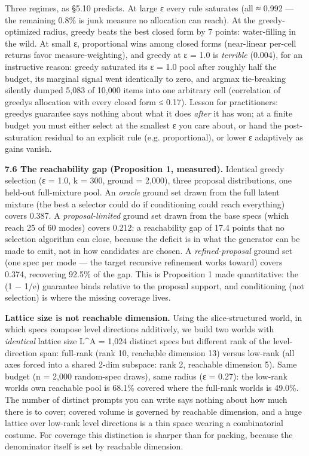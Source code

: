 \documentclass[
  10pt,
]{article}
\theoremstyle{plain}
\theoremstyle{definition}
\begin{document}
Three regimes, as §5.10 predicts. At large ε every rule saturates (all ≈
0.992 --- the remaining 0.8\% is junk measure no allocation can reach).
At the greedy-optimized radius, greedy beats the best closed form by 7
points: water-filling in the wild. At small ε, proportional wins among
closed forms (near-linear per-cell returns favor measure-weighting), and
greedy at ε = 1.0 is \emph{terrible} (0.004), for an instructive reason:
greedy saturated its ε = 1.0 pool after roughly half the budget, its
marginal signal went identically to zero, and argmax tie-breaking
silently dumped 5,083 of 10,000 items into one arbitrary cell
(correlation of greedy\textquotesingle s allocation with every closed
form ≤ 0.17). Lesson for practitioners: greedy\textquotesingle s
guarantee says nothing about what it does \emph{after} it has won; at a
finite budget you must either select at the smallest ε you care about,
or hand the post-saturation residual to an explicit rule (e.g.
proportional), or lower ε adaptively as gains vanish.

\textbf{7.6 The reachability gap (Proposition 1, measured).} Identical
greedy selection (ε = 1.0, k = 300, \textbar ground\textbar{} = 2,000),
three proposal distributions, one held-out full-mixture pool. An
\emph{oracle} ground set drawn from the full latent mixture (the best a
selector could do if conditioning could reach everything) covers 0.387.
A \emph{proposal-limited} ground set drawn from the base specs (which
reach 25 of 60 modes) covers 0.212: a reachability gap of 17.4 points
that no selection algorithm can close, because the deficit is in what
the generator can be made to emit, not in how candidates are chosen. A
\emph{refined-proposal} ground set (one spec per mode --- the target
recursive refinement works toward) covers 0.374, recovering 92.5\% of
the gap. This is Proposition 1 made quantitative: the (1 − 1/e)
guarantee binds relative to the proposal support, and conditioning (not
selection) is where the missing coverage lives.

\textbf{Lattice size is not reachable dimension.} Using the
slice-structured world, in which specs compose level directions
additively, we build two worlds with \emph{identical} lattice size
L\^{}A = 1,024 distinct specs but different rank of the level-direction
span: full-rank (rank 10, reachable dimension 13) versus low-rank (all
axes forced into a shared 2-dim subspace: rank 2, reachable dimension
5). Same budget (n = 2,000 random-spec draws), same radius (ε = 0.27):
the low-rank world\textquotesingle s own reachable pool is 68.1\%
covered where the full-rank world\textquotesingle s is 49.0\%. The
number of distinct prompts you can write says nothing about how much
there is to cover; covered volume is governed by reachable dimension,
and a huge lattice over low-rank level directions is a thin space
wearing a combinatorial costume. For coverage this distinction is
sharper than for packing, because the denominator itself is set by
reachable dimension.
\end{document}

